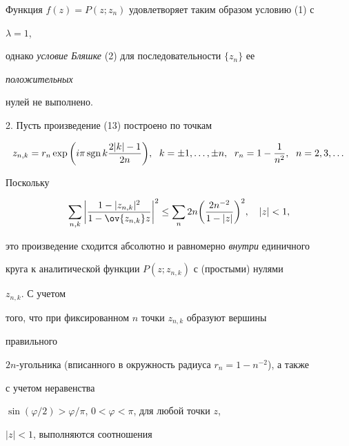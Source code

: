 Функция $f(z)=P(z;z_n)$ удовлетворяет таким образом условию (1) с 


$\lambda=1$, 


однако {\it условие Бляшке} (2) для последовательности $\{z_n\}$ ее 


{\it положительных} 


нулей не выполнено. 


\medskip 


 


2. Пусть произведение (13) построено по точкам 


$$ 


z_{n,k}=r_n\exp\bigg(i\pi\text{\,sgn\,}k 


\frac{2|k|-1}{2n} \bigg),\ \; k=\pm1,\dotsc,\pm n,\ \; 


r_n=1-\frac{1}{n^2},\ \; n=2,3,\dotsc 


$$ 


Поскольку 


$$ 


\sum_{n,k}\bigg| 


\frac{1-|z_{n,k}|^2}{1-\ov{z_{n,k}}z}\bigg|^2\le\sum_n 


2n\bigg(\frac{2n^{-2}}{1-|z|} \bigg)^2,\quad |z|<1, 


$$ 


это произведение сходится абсолютно и равномерно {\it внутри} единичного 


круга к аналитической функции $P(z;z_{n,k})$ с (простыми) нулями 


$z_{n,k}$. С учетом 


того, что при фиксированном $n$ точки $z_{n,k}$ образуют вершины 


правильного 


$2n$-угольника (вписанного в окружность радиуса $r_n=1-n^{-2}$), а также 


с учетом неравенства 


$\sin(\varphi/2)>\varphi/\pi$, $0<\varphi<\pi$, для любой точки $z$, 


$|z|<1$, выполняются соотношения 


